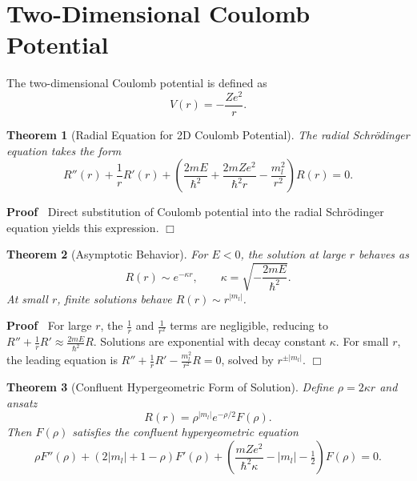 \documentclass{article}
\newenvironment{proof}{\noindent\textbf{Proof\ }}{\hspace*{\fill}$\Box$\medskip}
\newtheorem{theorem}{Theorem}
\begin{document}
\section{Two-Dimensional Coulomb Potential}

The two-dimensional Coulomb potential is defined as
\begin{equation}
  V (r) = - \frac{Ze^2}{r} .
\end{equation}
\begin{theorem}
  [Radial Equation for 2D Coulomb Potential] The radial Schr{\"o}dinger
  equation takes the form
  \begin{equation}
    R'' (r) + \frac{1}{r} R' (r) + \left( \frac{2 mE}{\hbar^2} + \frac{2
    mZe^2}{\hbar^2 r} - \frac{m_l^2}{r^2} \right) R (r) = 0.
  \end{equation}
\end{theorem}

\begin{proof}
  Direct substitution of Coulomb potential into the radial Schr{\"o}dinger
  equation yields this expression.
\end{proof}

\begin{theorem}
  [Asymptotic Behavior] For $E < 0$, the solution at large $r$ behaves as
  \begin{equation}
    R (r) \sim e^{- \kappa r}, \qquad \kappa = \sqrt{- \frac{2 mE}{\hbar^2}} .
  \end{equation}
  At small $r$, finite solutions behave $R (r) \sim r^{|m_l |}$.
\end{theorem}

\begin{proof}
  For large $r$, the $\tfrac{1}{r}$ and $\tfrac{1}{r^2}$ terms are negligible,
  reducing to $R'' + \frac{1}{r} R' \approx \frac{2 mE}{\hbar^2} R$. Solutions
  are exponential with decay constant $\kappa$. For small $r$, the leading
  equation is $R'' + \frac{1}{r} R' - \frac{m_l^2}{r^2} R = 0$, solved by
  $r^{\pm |m_l |}$.
\end{proof}

\begin{theorem}
  [Confluent Hypergeometric Form of Solution] Define $\rho = 2 \kappa r$ and
  ansatz
  \begin{equation}
    R (r) = \rho^{|m_l |} e^{- \rho / 2} F (\rho) .
  \end{equation}
  Then $F (\rho)$ satisfies the confluent hypergeometric equation
  \begin{equation}
    \rho F'' (\rho) + (2| m_l | + 1 - \rho) F' (\rho) + \left(
    \frac{mZe^2}{\hbar^2 \kappa} - |m_l | - \tfrac{1}{2} \right) F (\rho) = 0.
  \end{equation}
\end{theorem}
\end{document}
